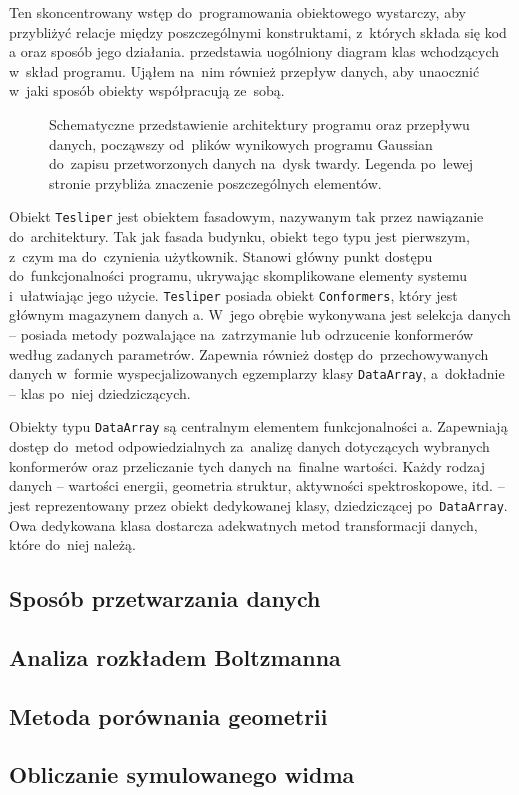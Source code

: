 Ten skoncentrowany wstęp do~programowania obiektowego wystarczy, aby przybliżyć relacje między
  poszczególnymi konstruktami, z~których składa się kod \tesliper{}a oraz sposób jego działania.
 przedstawia uogólniony diagram klas wchodzących w~skład programu.
Ująłem na~nim również przepływ danych, aby unaocznić w~jaki sposób obiekty współpracują ze~sobą.

\begin{figure}
  
  \caption{
    Schematyczne przedstawienie architektury programu \tesliper{} oraz przepływu danych,
      począwszy od~plików wynikowych programu Gaussian do~zapisu przetworzonych danych
      na~dysk twardy.
    Legenda po~lewej stronie przybliża znaczenie poszczególnych elementów.
  }
  \label{fig:class-diagram}
\end{figure}

Obiekt \texttt{Tesliper} jest obiektem fasadowym, nazywanym tak przez nawiązanie do~architektury.
Tak jak fasada budynku, obiekt tego typu jest pierwszym, z~czym ma do~czynienia użytkownik.
Stanowi główny punkt dostępu do~funkcjonalności programu, ukrywając skomplikowane elementy
  systemu i~ułatwiając jego użycie.
\texttt{Tesliper} posiada obiekt \texttt{Conformers},
  który jest głównym magazynem danych \tesliper{}a.
W~jego obrębie wykonywana jest selekcja danych \--- posiada metody pozwalające
  na~zatrzymanie lub odrzucenie
  konformerów według zadanych parametrów.
Zapewnia również dostęp do~przechowywanych danych w~formie wyspecjalizowanych egzemplarzy
  klasy \texttt{DataArray}, a~dokładnie \--- klas po~niej dziedziczących.

Obiekty typu \texttt{DataArray} są centralnym elementem funkcjonalności \tesliper{}a.
Zapewniają dostęp do~metod odpowiedzialnych za~analizę danych dotyczących wybranych konformerów
  oraz przeliczanie tych danych na~finalne wartości.
Każdy rodzaj danych \--- wartości energii, geometria struktur, aktywności spektroskopowe, itd.
  \--- jest reprezentowany przez obiekt dedykowanej klasy, dziedziczącej po~\texttt{DataArray}.
Owa dedykowana klasa dostarcza adekwatnych metod transformacji danych, które do~niej należą.

\subsection{Sposób przetwarzania danych}\label{implementation:parsing}
\subsection{Analiza rozkładem Boltzmanna}\label{implementation:boltzmann}
\subsection{Metoda porównania geometrii}\label{implementation:rmsd}
\subsection{Obliczanie symulowanego widma}\label{implementation:spectra}
